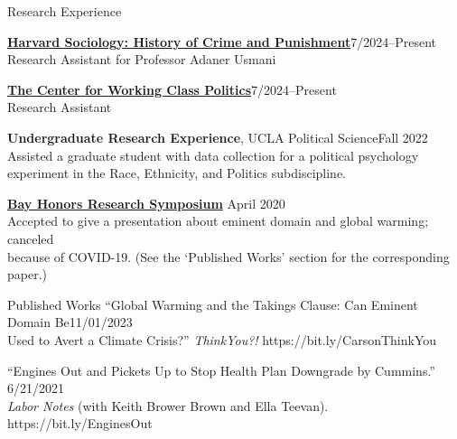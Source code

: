 \documentclass[
	12pt, %
]{resume} %
\begin{document}
\begin{rSection}{Research Experience}
%

\href{https://sociology.fas.harvard.edu/}{\textbf{Harvard Sociology: History of Crime and Punishment}}\hfill 7/2024--Present\\
\hspace*{20pt}Research Assistant for Professor Adaner Usmani

\href{https://www.workingclasspolitics.org/}{\textbf{The Center for Working Class Politics}}\hfill 7/2024--Present\\
\hspace*{20pt}Research Assistant

\textbf{Undergraduate Research Experience}, UCLA Political Science\hfill Fall 2022\\
\hspace*{20pt}Assisted a graduate student with data collection for a political psychology\\ 
\hspace*{20pt}experiment in the Race, Ethnicity, and Politics subdiscipline.

\href{https://bayhonors.org/}{\textbf{Bay Honors Research Symposium}} \hfill  April 2020\\
\hspace*{20pt}Accepted to give a presentation about eminent domain and global warming; canceled\\
\hspace*{20pt}because of COVID-19. (See the ‘Published Works’ section for the corresponding paper.)

\end{rSection}
\begin{rSection}{Published Works}
“Global Warming and the Takings Clause: Can Eminent Domain Be\hfill 11/01/2023 \\
Used to Avert a Climate Crisis?” \textit{ThinkYou?!} https://bit.ly/CarsonThinkYou

“Engines Out and Pickets Up to Stop Health Plan Downgrade by Cummins.” \hfill 6/21/2021 \\
\textit{Labor Notes} (with Keith Brower Brown and Ella Teevan). https://bit.ly/EnginesOut

\end{rSection}
\end{document}
